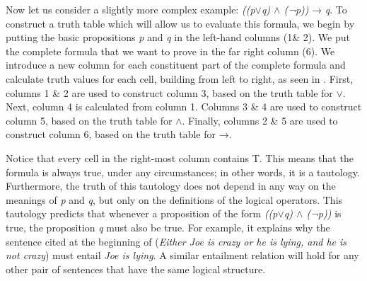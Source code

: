 Now let us consider a slightly more complex example: \textit{((p$\vee$q) $\wedge$ (¬p))} → \textit{q}. To construct a truth table which will allow us to evaluate this formula, we begin by putting the basic propositions \textit{p} and \textit{q} in the left-hand columns (1\& 2). We put the complete formula that we want to prove in the far right column (6). We introduce a new column for each constituent part of the complete formula and calculate truth values for each cell, building from left to right, as seen in . First, columns 1 \& 2 are used to construct column 3, based on the truth table for \textit{$\vee$}. Next, column 4 is calculated from column 1. Columns 3 \& 4 are used to construct column 5, based on the truth table for \textit{$\wedge$}. Finally, columns 2 \& 5 are used to construct column 6, based on the truth table for →.



Notice that every cell in the right-most column contains T. This means that the formula is always true, under any circumstances; in other words, it is a tautology. Furthermore, the truth of this tautology does not depend in any way on the meanings of \textit{p} and \textit{q}, but only on the definitions of the logical operators. This tautology predicts that whenever a proposition of the form \textit{((p$\vee$q) $\wedge$ (¬p))} is true, the proposition \textit{q} must also be true. For example, it explains why the sentence cited at the beginning of  (\textit{Either Joe is crazy or he is lying, and he is not crazy}) must entail \textit{Joe is lying}. A similar entailment relation will hold for any other pair of sentences that have the same logical structure.



